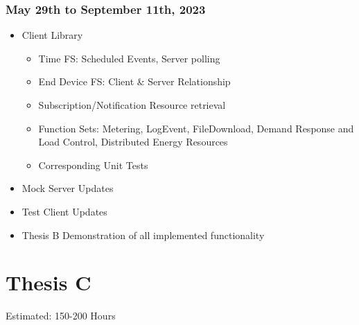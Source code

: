 \subsubsection{May 29th to September 11th, 2023}
\begin{itemize}
    \item Client Library
    \begin{itemize}
        \item Time FS: Scheduled Events, Server polling
        \item End Device FS: Client \& Server Relationship
        \item Subscription/Notification Resource retrieval
        \item Function Sets: Metering, LogEvent, FileDownload, Demand Response and Load Control, Distributed Energy Resources
        \item Corresponding Unit Tests
    \end{itemize}
    \item Mock Server Updates
    \item Test Client Updates
    \item Thesis B Demonstration of all implemented functionality
\end{itemize}




\section{Thesis C}
Estimated: 150-200 Hours

